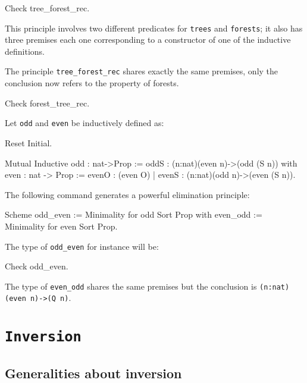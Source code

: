 \begin{coq_example*}
\begin{coq_example}
Check tree_forest_rec.
\end{coq_example}

This principle involves two different predicates for {\tt trees} and
{\tt forests}; it also has three premises each one corresponding to a
constructor of one of the inductive definitions.

The principle {\tt tree\_forest\_rec} shares exactly the same
premises, only the conclusion now refers to the property of forests.

\begin{coq_example}
Check forest_tree_rec.
\end{coq_example}


Let {\tt odd} and {\tt even} be inductively defined as:

\begin{coq_eval}
Reset Initial.
\end{coq_eval}

\begin{coq_example*}
Mutual Inductive odd : nat->Prop := 
    oddS : (n:nat)(even n)->(odd (S n))
with even : nat -> Prop := 
    evenO : (even O) 
  | evenS : (n:nat)(odd n)->(even (S n)).  
\end{coq_example*}

The following command generates a powerful elimination
principle:

\begin{coq_example*}
Scheme odd_even := Minimality for odd Sort Prop
with   even_odd := Minimality for even Sort Prop.
\end{coq_example*}

The type of {\tt odd\_even} for instance will be:

\begin{coq_example}
Check odd_even.
\end{coq_example}

The type of {\tt even\_odd} shares the same premises but the
conclusion is {\tt (n:nat)(even n)->(Q n)}.


\section{{\tt Inversion}}
\label{Inversion-examples}

\subsection*{Generalities about inversion}


\end{coq_example*}
